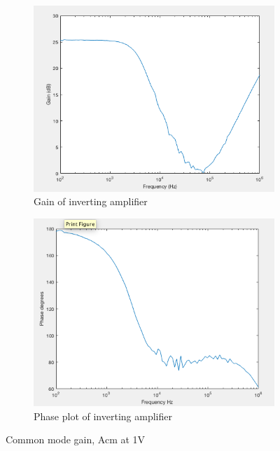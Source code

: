 				\begin{figure}[H]
		\centering
		\begin{subfigure}[b]{0.45\textwidth}
			\centering
		\includegraphics[scale=.40]{ExperimentalImplementation/invertingain.png}
\caption{Gain of inverting amplifier}
\label{fig:invertinggain1}
		\end{subfigure}
		\hfill
		\begin{subfigure}[b]{0.45\textwidth}
			\centering
		\includegraphics[scale=.40]{ExperimentalImplementation/invertingphase.png}
\caption{Phase plot of inverting amplifier}
\label{fig:invertingphase}
		\end{subfigure}
		\caption{Common mode gain, Acm at 1V}
		\label{fig:invertinggain}
	\end{figure} 




